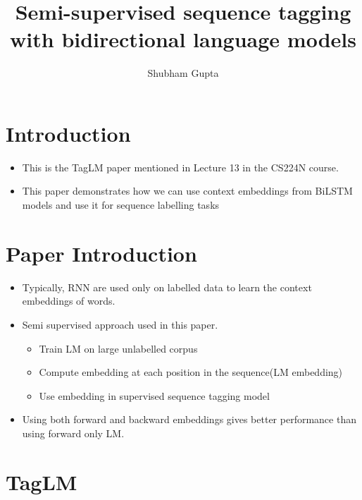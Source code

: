 \documentclass[a4paper]{article}
\title{Semi-supervised sequence tagging with bidirectional language models}
\author{Shubham Gupta}
\begin{document}
\maketitle
\section{Introduction}
\begin{itemize}
    \item This is the TagLM paper mentioned in Lecture 13 in the CS224N course.
    \item This paper demonstrates how we can use context embeddings from BiLSTM models and use it for sequence labelling tasks
\end{itemize}
\section{Paper Introduction}
\begin{itemize}
    \item Typically, RNN are used only on labelled data to learn the context embeddings of words.
    \item Semi supervised approach used in this paper.
    \begin{itemize}
        \item Train LM on large unlabelled corpus
        \item Compute embedding at each position in the sequence(LM embedding)
        \item Use embedding in supervised sequence tagging model
    \end{itemize}
    \item Using both forward and backward embeddings gives better performance than using forward only LM.
\end{itemize}
\section{TagLM}
\end{document}
